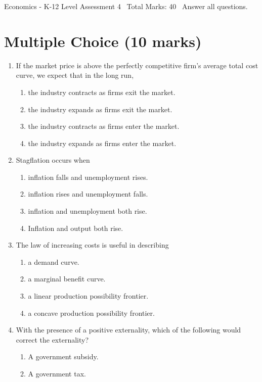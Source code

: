 \documentclass[12pt]{article}
\begin{document}
\begin{center}
Economics - K-12 Level Assessment 4 \
Total Marks: 40 \
Answer all questions.
\end{center}

\section*{Multiple Choice (10 marks)}
\begin{enumerate}[label=\arabic*.]
\item If the market price is above the perfectly competitive firm's average total cost curve, we expect that in the long run,
\begin{enumerate}[label=(\alph*)]
    \item the industry contracts as firms exit the market.
    \item the industry expands as firms exit the market.
    \item the industry contracts as firms enter the market.
    \item the industry expands as firms enter the market.
\end{enumerate}
\item Stagflation occurs when
\begin{enumerate}[label=(\alph*)]
    \item inflation falls and unemployment rises.
    \item inflation rises and unemployment falls.
    \item inflation and unemployment both rise.
    \item Inflation and output both rise.
\end{enumerate}
\item The law of increasing costs is useful in describing
\begin{enumerate}[label=(\alph*)]
    \item a demand curve.
    \item a marginal benefit curve.
    \item a linear production possibility frontier.
    \item a concave production possibility frontier.
\end{enumerate}
\item With the presence of a positive externality, which of the following would correct the externality?
\begin{enumerate}[label=(\alph*)]
    \item A government subsidy.
    \item A government tax.

\end{enumerate}
\end{enumerate}
\end{document}

